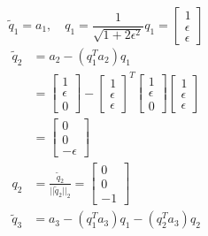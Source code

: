 \documentclass[english,onecolumn]{IEEEtran}
\begin{document}
\begin{enumerate}
\begin{itemize}
   	$$\tilde{q}_1=a_1,\quad q_1=\frac{1}{\sqrt{1+2\epsilon^2}}q_1=\begin{bmatrix}  1 \\ \epsilon \\ \epsilon \end{bmatrix}$$
   	\begin{align*}
   		\tilde{q}_2 &= a_2-(q_1^Ta_2)q_1\\
   		&= \begin{bmatrix}  1 \\ \epsilon \\ 0 \end{bmatrix} - \begin{bmatrix}  1 \\ \epsilon \\ \epsilon \end{bmatrix}^T\begin{bmatrix}  1 \\ \epsilon \\ 0 \end{bmatrix} \begin{bmatrix}  1 \\ \epsilon \\ \epsilon \end{bmatrix}\\
   		&=\begin{bmatrix}  0 \\ 0 \\ -\epsilon \end{bmatrix}\\
   		q_2 & = \frac{\tilde{q}_2}{||\tilde{q}_2||_2}= \begin{bmatrix}  0\\ 0 \\ -1 \end{bmatrix}
   	\end{align*}
   	\begin{align*}
   		\tilde{q}_3 &= a_3-(q_1^Ta_3)q_1-(q_2^Ta_3)q_2\\

\end{align*}
\end{itemize}
\end{enumerate}
\end{document}
